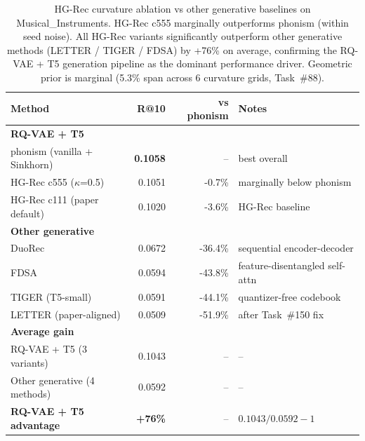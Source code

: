 \begin{table}[t]
\centering
\caption{HG-Rec curvature ablation vs other generative baselines on Musical_Instruments.
HG-Rec c555 marginally outperforms phonism (within seed noise). All HG-Rec variants
significantly outperform other generative methods (LETTER / TIGER / FDSA) by +76\% on average,
confirming the RQ-VAE + T5 generation pipeline as the dominant performance driver.
Geometric prior is marginal (5.3\% span across 6 curvature grids, Task~\#88).}
\label{tab:hgrec_vs_generative}
\small
\begin{tabular}{l r r l}
\toprule
Method & R@10 & vs phonism & Notes \\
\midrule
\textbf{RQ-VAE + T5} & & & \\
\quad phonism (vanilla + Sinkhorn) & \textbf{0.1058} & -- & best overall \\
\quad HG-Rec c555 ($\kappa$=0.5) & 0.1051 & -0.7\% & marginally below phonism \\
\quad HG-Rec c111 (paper default) & 0.1020 & -3.6\% & HG-Rec baseline \\
\midrule
\textbf{Other generative} & & & \\
\quad DuoRec & 0.0672 & -36.4\% & sequential encoder-decoder \\
\quad FDSA & 0.0594 & -43.8\% & feature-disentangled self-attn \\
\quad TIGER (T5-small) & 0.0591 & -44.1\% & quantizer-free codebook \\
\quad LETTER (paper-aligned) & 0.0509 & -51.9\% & after Task~\#150 fix \\
\midrule
\textbf{Average gain} & & & \\
\quad RQ-VAE + T5 (3 variants) & 0.1043 & -- & -- \\
\quad Other generative (4 methods) & 0.0592 & -- & -- \\
\quad \textbf{RQ-VAE + T5 advantage} & \textbf{+76\%} & -- & $0.1043/0.0592 - 1$ \\
\bottomrule
\end{tabular}
\end{table}